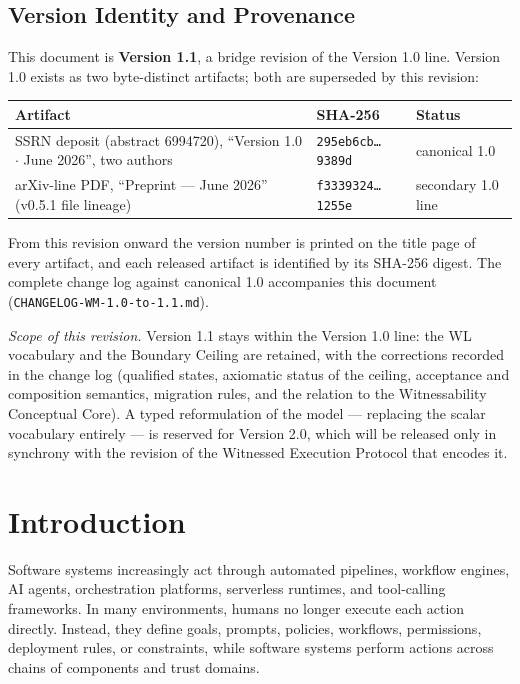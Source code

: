 \documentclass[11pt]{article}
\begin{document}
\subsection*{Version Identity and Provenance}

This document is \textbf{Version 1.1}, a bridge revision of the Version 1.0 line. Version 1.0 exists as two byte-distinct artifacts; both are superseded by this revision:

\begin{center}
\small
\begin{tabularx}{\textwidth}{@{}Yll@{}}
\toprule
Artifact & SHA-256 & Status \\
\midrule
SSRN deposit (abstract 6994720), ``Version 1.0 $\cdot$ June 2026'', two authors & \texttt{295eb6cb\ldots{}9389d} & canonical 1.0 \\
arXiv-line PDF, ``Preprint --- June 2026'' (v0.5.1 file lineage) & \texttt{f3339324\ldots{}1255e} & secondary 1.0 line \\
\bottomrule
\end{tabularx}
\end{center}

From this revision onward the version number is printed on the title page of every artifact, and each released artifact is identified by its SHA-256 digest. The complete change log against canonical 1.0 accompanies this document (\texttt{CHANGELOG-WM-1.0-to-1.1.md}).

\emph{Scope of this revision.} Version 1.1 stays within the Version 1.0 line: the WL vocabulary and the Boundary Ceiling are retained, with the corrections recorded in the change log (qualified states, axiomatic status of the ceiling, acceptance and composition semantics, migration rules, and the relation to the Witnessability Conceptual Core). A typed reformulation of the model --- replacing the scalar vocabulary entirely --- is reserved for Version 2.0, which will be released only in synchrony with the revision of the Witnessed Execution Protocol that encodes it.

\section{Introduction}

Software systems increasingly act through automated pipelines, workflow engines, AI agents, orchestration platforms, serverless runtimes, and tool-calling frameworks. In many environments, humans no longer execute each action directly. Instead, they define goals, prompts, policies, workflows, permissions, deployment rules, or constraints, while software systems perform actions across chains of components and trust domains.
\end{document}
